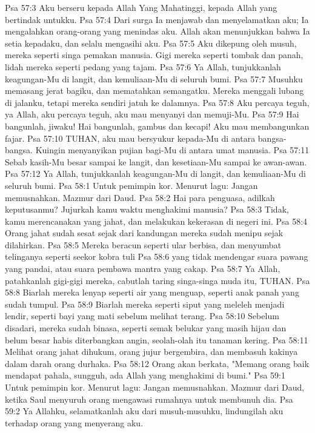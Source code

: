 Psa 57:3  Aku berseru kepada Allah Yang Mahatinggi, kepada Allah yang bertindak untukku.
Psa 57:4  Dari surga Ia menjawab dan menyelamatkan aku; Ia mengalahkan orang-orang yang menindas aku. Allah akan menunjukkan bahwa Ia setia kepadaku, dan selalu mengasihi aku.
Psa 57:5  Aku dikepung oleh musuh, mereka seperti singa pemakan manusia. Gigi mereka seperti tombak dan panah, lidah mereka seperti pedang yang tajam.
Psa 57:6  Ya Allah, tunjukkanlah keagungan-Mu di langit, dan kemuliaan-Mu di seluruh bumi.
Psa 57:7  Musuhku memasang jerat bagiku, dan mematahkan semangatku. Mereka menggali lubang di jalanku, tetapi mereka sendiri jatuh ke dalamnya.
Psa 57:8  Aku percaya teguh, ya Allah, aku percaya teguh, aku mau menyanyi dan memuji-Mu.
Psa 57:9  Hai bangunlah, jiwaku! Hai bangunlah, gambus dan kecapi! Aku mau membangunkan fajar.
Psa 57:10  TUHAN, aku mau bersyukur kepada-Mu di antara bangsa-bangsa. Kuingin menyanyikan pujian bagi-Mu di antara umat manusia.
Psa 57:11  Sebab kasih-Mu besar sampai ke langit, dan kesetiaan-Mu sampai ke awan-awan.
Psa 57:12  Ya Allah, tunjukkanlah keagungan-Mu di langit, dan kemuliaan-Mu di seluruh bumi.
Psa 58:1  Untuk pemimpin kor. Menurut lagu: Jangan memusnahkan. Mazmur dari Daud.
Psa 58:2  Hai para penguasa, adilkah keputusanmu? Jujurkah kamu waktu menghakimi manusia?
Psa 58:3  Tidak, kamu merencanakan yang jahat, dan melakukan kekerasan di negeri ini.
Psa 58:4  Orang jahat sudah sesat sejak dari kandungan mereka sudah menipu sejak dilahirkan.
Psa 58:5  Mereka beracun seperti ular berbisa, dan menyumbat telinganya seperti seekor kobra tuli
Psa 58:6  yang tidak mendengar suara pawang yang pandai, atau suara pembawa mantra yang cakap.
Psa 58:7  Ya Allah, patahkanlah gigi-gigi mereka, cabutlah taring singa-singa muda itu, TUHAN.
Psa 58:8  Biarlah mereka lenyap seperti air yang menguap, seperti anak panah yang sudah tumpul.
Psa 58:9  Biarlah mereka seperti siput yang meleleh menjadi lendir, seperti bayi yang mati sebelum melihat terang.
Psa 58:10  Sebelum disadari, mereka sudah binasa, seperti semak belukar yang masih hijau dan belum besar habis diterbangkan angin, seolah-olah itu tanaman kering.
Psa 58:11  Melihat orang jahat dihukum, orang jujur bergembira, dan membasuh kakinya dalam darah orang durhaka.
Psa 58:12  Orang akan berkata, "Memang orang baik mendapat pahala, sungguh, ada Allah yang menghakimi di bumi."
Psa 59:1  Untuk pemimpin kor. Menurut lagu: Jangan memusnahkan. Mazmur dari Daud, ketika Saul menyuruh orang mengawasi rumahnya untuk membunuh dia.
Psa 59:2  Ya Allahku, selamatkanlah aku dari musuh-musuhku, lindungilah aku terhadap orang yang menyerang aku.
